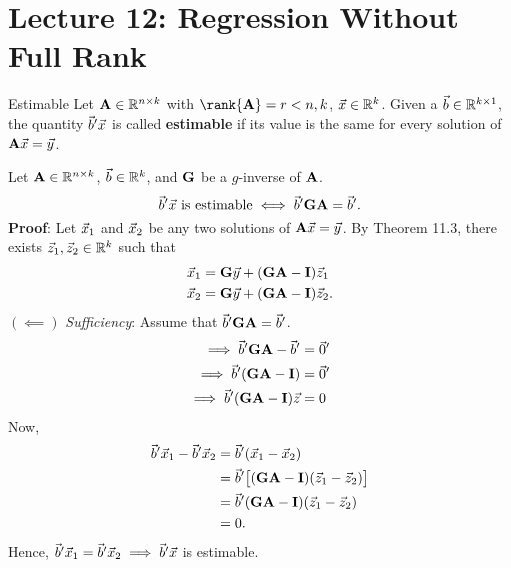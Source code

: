 \section{Lecture 12: Regression Without Full Rank}
\begin{Definition}{Estimable}{}
    Let $ \mathbf{A}\in\mathbb{R}^{n\times k} $ with $ \rank{\Matrix{A}}=r<\min{n,k} $,
    $ \vec{x}\in\mathbb{R}^{k} $. Given a $ \vec{b}\in\mathbb{R}^{k\times 1} $, the quantity $ \vec{b}'\vec{x} $
    is called \textbf{estimable} if its value is the same for every solution of $ \mathbf{A}\vec{x}=\vec{y} $.
\end{Definition}
\begin{Theorem}{}{}
    Let $ \mathbf{A}\in\mathbb{R}^{n\times k} $, $ \vec{b}\in\mathbb{R}^{k} $,
    and $ \mathbf{G} $ be a $ g $-inverse of $ \mathbf{A} $.
    \[ \vec{b}'\vec{x}\text{ is estimable}\iff \vec{b}'\mathbf{G}\mathbf{A}=\vec{b}'. \]
    \tcblower{}
    \textbf{Proof}:
    Let $ \vec{x}_1 $ and $\vec{x}_2 $ be any two solutions of $ \mathbf{A}\vec{x}=\vec{y} $.
    By Theorem 11.3, there exists $ \vec{z}_1,\vec{z}_2\in\mathbb{R}^{k} $
    such that
    \begin{align*}
        \vec{x}_1 & =\mathbf{G}\vec{y}+(\mathbf{G}\mathbf{A}-\mathbf{I})\vec{z}_1  \\
        \vec{x}_2 & =\mathbf{G}\vec{y}+(\mathbf{G}\mathbf{A}-\mathbf{I})\vec{z}_2.
    \end{align*}
    $ (\impliedby) $ \emph{Sufficiency}: Assume that $ \vec{b}'\mathbf{G}\mathbf{A}=\vec{b}' $.
    \begin{align*}
        \implies \vec{b}'\mathbf{G}\mathbf{A}-\vec{b}'            & =\vec{0}' \\
        \implies \vec{b}'(\mathbf{G}\mathbf{A}-\mathbf{I})           & =\vec{0}' \\
        \implies \vec{b}'(\mathbf{G}\mathbf{A}-\mathbf{I})\vec{z} & =0
    \end{align*}
    Now,
    \begin{align*}
        \vec{b}'\vec{x}_1-\vec{b}'\vec{x}_2
         & =\vec{b}'(\vec{x}_1-\vec{x}_2)                                              \\
         & =\vec{b}'\bigl[(\mathbf{G}\mathbf{A}-\mathbf{I})(\vec{z}_1-\vec{z}_2)\bigr] \\
         & =\vec{b}'(\mathbf{G}\mathbf{A}-\mathbf{I})(\vec{z}_1-\vec{z}_2)             \\
         & =0.
    \end{align*}
    Hence, $ \vec{b}'\vec{x}_1=\vec{b}'\vec{x}_2\implies \vec{b}'\vec{x} $ is estimable.


\end{Theorem}
